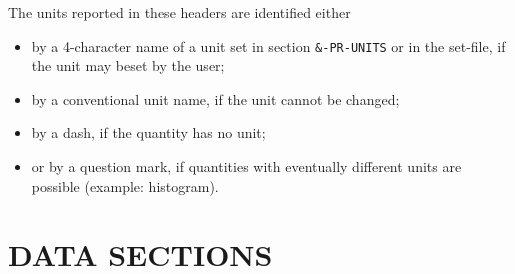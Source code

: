 \documentclass[10pt]{book}
\begin{document}
The units reported in these headers are identified either
\begin{itemize}
\item by a 4-character name of a unit set in section \verb|&-PR-UNITS| or in the set-file, if the unit may beset by the user;
\item by a conventional unit name, if the unit cannot be changed;
\item by a dash, if the quantity has no unit;
\item or by a question mark, if quantities with eventually different units are possible (example: histogram).
\end{itemize}

\chapter{DATA SECTIONS}
\end{document}
